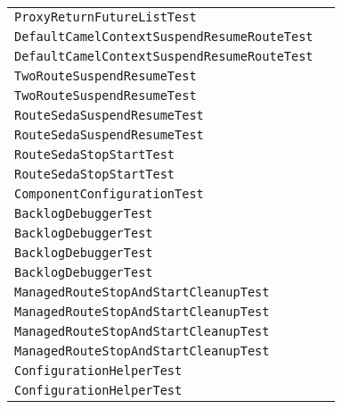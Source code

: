 \begin{center}
\begin{tabular}{ll}
\lstinline/ProxyReturnFutureListTest/&\raisebox{0pt}{\lstinline/testFutureListCallTwoTimes()/}\\
\lstinline/DefaultCamelContextSuspendResumeRouteTest/&\raisebox{0pt}{\lstinline/testSuspendResume()/}\\
\lstinline/DefaultCamelContextSuspendResumeRouteTest/&\raisebox{0pt}{\lstinline/testSuspendResume()/}\\
\lstinline/TwoRouteSuspendResumeTest/&\raisebox{0pt}{\lstinline/testSuspendResume()/}\\
\lstinline/TwoRouteSuspendResumeTest/&\raisebox{0pt}{\lstinline/testSuspendResume()/}\\
\lstinline/RouteSedaSuspendResumeTest/&\raisebox{0pt}{\lstinline/testSuspendResume()/}\\
\lstinline/RouteSedaSuspendResumeTest/&\raisebox{0pt}{\lstinline/testSuspendResume()/}\\
\lstinline/RouteSedaStopStartTest/&\raisebox{0pt}{\lstinline/testStopStart()/}\\
\lstinline/RouteSedaStopStartTest/&\raisebox{0pt}{\lstinline/testStopStart()/}\\
\lstinline/ComponentConfigurationTest/&\raisebox{0pt}{\lstinline/CreateNewDefaultComponentEndpoint()/}\\
\lstinline/BacklogDebuggerTest/&\raisebox{0pt}{\lstinline/logDebuggerUpdateBodyAndHeader()/}\\
\lstinline/BacklogDebuggerTest/&\raisebox{0pt}{\lstinline/logDebuggerUpdateBodyAndHeaderType()/}\\
\lstinline/BacklogDebuggerTest/&\raisebox{0pt}{\lstinline/logDebuggerRemoveBodyAndHeader()/}\\
\lstinline/BacklogDebuggerTest/&\raisebox{0pt}{\lstinline/logDebuggerConditional()/}\\
\lstinline/ManagedRouteStopAndStartCleanupTest/&\raisebox{0pt}{\lstinline/testStopAndStartRoute()/}\\
\lstinline/ManagedRouteStopAndStartCleanupTest/&\raisebox{0pt}{\lstinline/testStopAndStartRoute()/}\\
\lstinline/ManagedRouteStopAndStartCleanupTest/&\raisebox{0pt}{\lstinline/testStopAndStartRoute()/}\\
\lstinline/ManagedRouteStopAndStartCleanupTest/&\raisebox{0pt}{\lstinline/testStopAndStartRoute()/}\\
\lstinline/ConfigurationHelperTest/&\raisebox{0pt}{\lstinline/logConfigurationObject(EndpointConfiguration)/}\\
\lstinline/ConfigurationHelperTest/&\raisebox{0pt}{\lstinline/logConfigurationObject(EndpointConfiguration)/}\\

\end{tabular}
\end{center}
